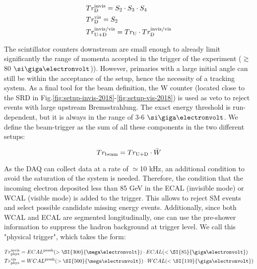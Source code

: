 \begin{equation}
\label{eq:trigger-downstream}
\begin{split}      
& Tr^{\rm{invis}}_{\rm{D}} = S_2 \cdot S_3 \cdot S_4 \\
& Tr^{\rm{vis}}_{\rm{D}} = S_2 \\
& Tr^{\rm{invis/vis}}_{\rm{U}+\rm{D}} = Tr_{\rm{U}} \cdot Tr^{\rm{invis/vis}}_{\rm{D}}
\end{split}
\end{equation}

The scintillator counters downstream are small enough to already limit significantly the range of momenta accepted in the trigger of the experiment ($\gtrsim$ 80 $\gev$)). However, primaries with a large initial angle can still be within the acceptance of the setup, hence the
necessity of a tracking system. As a final tool for the beam definition, the W counter (located close to the SRD in Fig.\ref{fig:setup-invis-2018}-\ref{fig:setup-vis-2018}) is used as veto to reject events with large upstream Bremsstrahlung. The exact energy threshold is run-dependent, but it is always in the range of 3-6 $\gev$. We define the beam-trigger as the sum of all these components in the two different setups:

\begin{equation}
\label{eq:trigger-beam}
Tr_{\rm{beam}} = Tr_{\rm{U}+\rm{D}} \cdot \bar{W}
\end{equation}

As the DAQ can collect data at a rate of $\simeq$10 \si{kHz}, an additional condition to avoid the saturation of the system is needed. Therefore, the condition that the incoming electron deposited less than 85 GeV in the ECAL (invisible mode) or WCAL (visible mode) is added to the trigger. This allows to reject SM events and select possible candidate missing energy events. Additionally, since both WCAL and ECAL are segmented longitudinally, one can use the pre-shower information to suppress the hadron background at trigger level. We call this "physical trigger", which takes the form:

\begin{equation}
\label{eq:trigger-phys}
\begin{split}
& Tr^{\rm{invis}}_{\rm{phys}} = ECAL^{\rm{presh}}(> \SI{300}{\mega\electronvolt}) \cdot ECAL(<\SI{85}{\giga\electronvolt})\\
& Tr^{\rm{vis}}_{\rm{phys}} = WCAL^{\rm{presh}}(>\SI{500}{\mega\electronvolt}) \cdot WCAL(<\SI{110}{\giga\electronvolt})
\end{split}
\end{equation}

